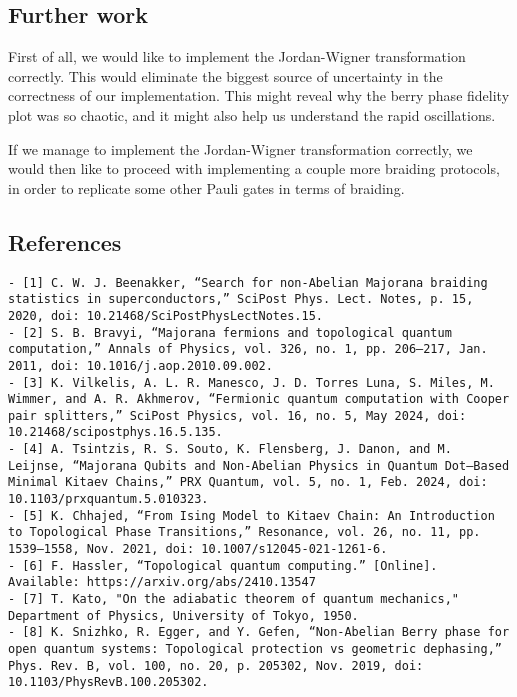 \documentclass[11pt,landscape]{article}
\begin{document}
\subsection{Further work}\label{further-work}

First of all, we would like to implement the Jordan-Wigner
transformation correctly. This would eliminate the biggest source of
uncertainty in the correctness of our implementation. This might reveal
why the berry phase fidelity plot was so chaotic, and it might also help
us understand the rapid oscillations.

If we manage to implement the Jordan-Wigner transformation correctly, we
would then like to proceed with implementing a couple more braiding
protocols, in order to replicate some other Pauli gates in terms of
braiding.

\subsection{References}\label{references}

\begin{verbatim}
- [1] C. W. J. Beenakker, “Search for non-Abelian Majorana braiding statistics in superconductors,” SciPost Phys. Lect. Notes, p. 15, 2020, doi: 10.21468/SciPostPhysLectNotes.15.
- [2] S. B. Bravyi, “Majorana fermions and topological quantum computation,” Annals of Physics, vol. 326, no. 1, pp. 206–217, Jan. 2011, doi: 10.1016/j.aop.2010.09.002.
- [3] K. Vilkelis, A. L. R. Manesco, J. D. Torres Luna, S. Miles, M. Wimmer, and A. R. Akhmerov, “Fermionic quantum computation with Cooper pair splitters,” SciPost Physics, vol. 16, no. 5, May 2024, doi: 10.21468/scipostphys.16.5.135.
- [4] A. Tsintzis, R. S. Souto, K. Flensberg, J. Danon, and M. Leijnse, “Majorana Qubits and Non-Abelian Physics in Quantum Dot–Based Minimal Kitaev Chains,” PRX Quantum, vol. 5, no. 1, Feb. 2024, doi: 10.1103/prxquantum.5.010323.
- [5] K. Chhajed, “From Ising Model to Kitaev Chain: An Introduction to Topological Phase Transitions,” Resonance, vol. 26, no. 11, pp. 1539–1558, Nov. 2021, doi: 10.1007/s12045-021-1261-6.
- [6] F. Hassler, “Topological quantum computing.” [Online]. Available: https://arxiv.org/abs/2410.13547
- [7] T. Kato, "On the adiabatic theorem of quantum mechanics," Department of Physics, University of Tokyo, 1950.
- [8] K. Snizhko, R. Egger, and Y. Gefen, “Non-Abelian Berry phase for open quantum systems: Topological protection vs geometric dephasing,” Phys. Rev. B, vol. 100, no. 20, p. 205302, Nov. 2019, doi: 10.1103/PhysRevB.100.205302.
\end{verbatim}


    
    
    
\end{document}
